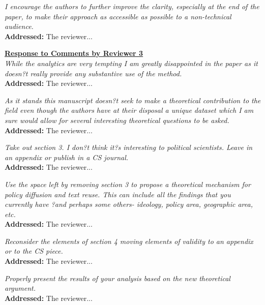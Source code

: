 \documentclass[12pt]{article}
\newcommand{\grey}[1]{{\color{mygrey}#1}}
\begin{document}
 \grey{\emph{ I encourage the authors to further improve the clarity, especially at the end of the paper, to make their approach as accessible as possible to a non-technical audience.}}\\

\noindent \textcolor{MyGreen}{\textbf{Addressed:}} The reviewer... 


\noindent \underline{\textbf{Response to Comments by Reviewer 3}}\\

 \grey{\emph{ While the analytics are very tempting I am greatly disappointed in the paper as it doesn?t really provide any substantive use of the method.}}\\

\noindent \textcolor{MyGreen}{\textbf{Addressed:}} The reviewer... 

 \grey{\emph{ As it stands this manuscript doesn?t seek to make a theoretical contribution to the field even though the authors have at their disposal a unique dataset which I am sure would allow for several interesting theoretical questions to be asked.}}\\

\noindent \textcolor{MyGreen}{\textbf{Addressed:}} The reviewer... 

 \grey{\emph{ Take out section 3. I don?t think it?s interesting to political scientists. Leave in an appendix or publish in a CS journal.}}\\

\noindent \textcolor{MyGreen}{\textbf{Addressed:}} The reviewer... 

 \grey{\emph{ Use the space left by removing section 3 to propose a theoretical mechanism for policy diffusion and text reuse. This can include all the findings that you currently have ?and perhaps some others- ideology, policy area, geographic area, etc.}}\\

\noindent \textcolor{MyGreen}{\textbf{Addressed:}} The reviewer... 

 \grey{\emph{ Reconsider the elements of section 4 moving elements of validity to an appendix or to the CS piece.}}\\

\noindent \textcolor{MyGreen}{\textbf{Addressed:}} The reviewer... 

 \grey{\emph{ Properly present the results of your analysis based on the new theoretical argument.}}\\

\noindent \textcolor{MyGreen}{\textbf{Addressed:}} The reviewer... 
\end{document}
